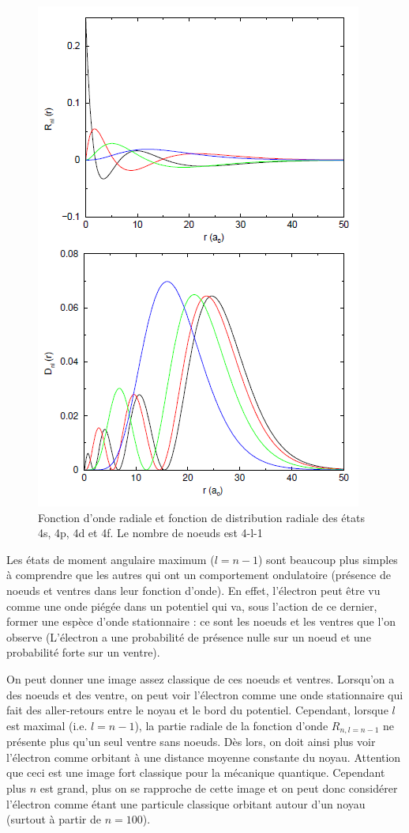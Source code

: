 \begin{figure}[tph]
    \centering
    \includegraphics{Images2/spdf.PNG}
    \caption{Fonction d'onde radiale et fonction de distribution radiale des états 4s, 4p, 4d et 4f. Le nombre de noeuds est 4-l-1}
    \label{fig:fcx_et_dist_rad_4}
\end{figure}

Les états de moment angulaire maximum ($l=n-1$) sont beaucoup plus simples à comprendre que les autres qui ont un comportement ondulatoire (présence de noeuds et ventres dans leur fonction d'onde). En effet, l'électron peut être vu comme une onde piégée dans un potentiel qui va, sous l'action de ce dernier, former une espèce d'onde stationnaire : ce sont les noeuds et les ventres que l'on observe (L'électron a une probabilité de présence nulle sur un noeud et une probabilité forte sur un ventre).

On peut donner une image assez classique de ces noeuds et ventres. Lorsqu'on a des noeuds et des ventre, on peut voir l'électron comme une onde stationnaire qui fait des aller-retours entre le noyau et le bord du potentiel. Cependant, lorsque $l$ est maximal (i.e. $l=n-1$), la partie radiale de la fonction d'onde $R_{n,l=n-1}$ ne présente plus qu'un seul ventre sans noeuds. Dès lors, on doit ainsi plus voir l'électron comme orbitant à une distance moyenne constante du noyau. Attention que ceci est une image fort classique pour la mécanique quantique. Cependant plus $n$ est grand, plus on se rapproche de cette image et on peut donc considérer l'électron comme étant une particule classique orbitant autour d'un noyau (surtout à partir de $n=100$).

